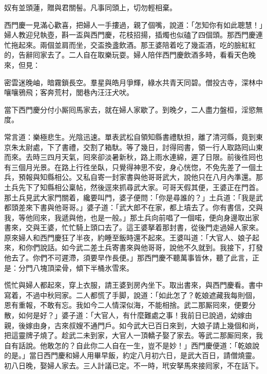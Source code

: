 \begin{myquote} 
奴有並頭蓮，贈與君關髻。凡事同頭上，切勿輕相棄。
\end{myquote} 

西門慶一見滿心歡喜，把婦人一手摟過，親了個嘴，說道：「怎知你有如此聰慧！」{}婦人教迎兒執壺，斟一盃與西門慶，花枝招揚，插燭也似磕了四個頭。那西門慶連忙拖起來。兩個並肩而坐，交盃換盞飲酒。那王婆陪着吃了幾盃酒，吃的臉紅紅的，告辭囘家去了。二人自在取樂玩耍。婦人陪伴西門慶飲酒多時，看看天色晚來，但見：

\begin{myquote} 
密雲迷晚岫，暗霧鎖長空。羣星與皓月爭輝，綠水共青天同碧。僧投古寺，深林中嚷嚷鴉飛；客奔荒村，閭巷內汪汪犬吠。
\end{myquote} 

當下西門慶分付小厮囘馬家去，就在婦人家歇了。到晚夕，二人盡力盤桓，淫慾無度。

常言道：樂極悲生。光陰迅速。單表武松自領知縣書禮馱担，離了清河縣，竟到東京朱太尉處，下了書禮，交割了箱馱。等了幾日，討得囘書，領一行人取路囘山東而來。去時三四月天氣，囘來卻淡暑新秋，路上雨水連綿，遲了日限。前後徃囘也有三個月光景。在路上行徃坐臥，只覺得神思不安，身心恍惚，{}不免先差了一個土兵，預報與知縣相公。又私自寄一封家書與他哥哥武大，說他只在八月內準還。那土兵先下了知縣相公稟帖，然後逕來抓尋武大家。可哥天假其便，王婆正在門首。那土兵見武大家門關着，纔要叫門，婆子便問：「你是尋誰的？」土兵道：「我是武都頭差來下書與他哥哥。」婆子道：「武大郎不在家，都上墳去了。你有書信，交與我，等他囘來，我遞與他，也是一般。」那土兵向前唱了一個喏，便向身邊取出家書來，交與王婆，忙忙騎上頭口去了。這王婆拏着那封書，從後門走過婦人家來。原來婦人和西門慶狂了半夜，約睡至飯時還不起來。王婆叫道：「大官人、娘子起來，和你們說話。如今武二差土兵寄書來與他哥哥，說他不久就到。我接下，打發他去了。你們不可遲滯，須要早作長便。」那西門慶不聽萬事皆休，聽了此言，正是：分門八塊頂梁骨，傾下半桶氷雪來。

慌忙與婦人都起來，穿上衣服，請王婆到房內坐下。取出書來，與西門慶看。書中寫着，不過中秋囘家。二人都慌了手脚，說道：「如此怎了？乾娘遮藏我每則個，恩有重報，不敢有忘。我如今二人情深似海，不能相捨。武二那厮囘來，便要分散，如何是好？」婆子道：「大官人，有什麼難處之事！我前日已說過，幼嫁由親，後嫁由身，古來叔嫂不通門戶。如今武大已百日來到，大娘子請上幾個和尚，把這靈牌子燒了。趁武二未到家，大官人一頂轎子娶了家去。等武二那厮囘來，我自有話說。他敢怎的？自此你二人自在一生，豈不是妙！」西門慶便道：「乾娘說的是。」當日西門慶和婦人用畢早飯，約定八月初六日，是武大百日，請僧燒靈。初八日晚，娶婦人家去。三人計議已定。不一時，玳安拏馬來接囘家，不在話下。

